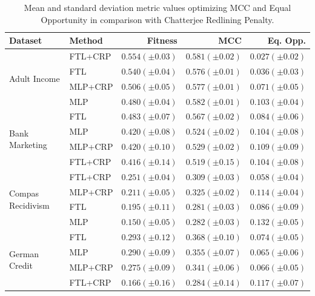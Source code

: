  \begin{table}
    \centering
    \caption{Mean and standard deviation metric values optimizing MCC and Equal Opportunity in comparison with Chatterjee Redlining Penalty.}\label{tab:complete_mcc_opportunity_crp}
    {\footnotesize\begin{tabular}{llrrr}
    \toprule
    Dataset & Method & Fitness & MCC & Eq. Opp. \\
    \midrule

    \multirow[t]{4}{*}{Adult Income} & FTL+CRP & $0.554 (\pm0.03)$ & $0.581 (\pm0.02)$ & $0.027 (\pm0.02)$ \\
     & FTL & $0.540 (\pm0.04)$ & $0.576 (\pm0.01)$ & $0.036 (\pm0.03)$ \\
     & MLP+CRP & $0.506 (\pm0.05)$ & $0.577 (\pm0.01)$ & $0.071 (\pm0.05)$ \\
     & MLP & $0.480 (\pm0.04)$ & $0.582 (\pm0.01)$ & $0.103 (\pm0.04)$ \\
    \midrule
    \multirow[t]{4}{*}{Bank Marketing} & FTL & $0.483 (\pm0.07)$ & $0.567 (\pm0.02)$ & $0.084 (\pm0.06)$ \\
     & MLP & $0.420 (\pm0.08)$ & $0.524 (\pm0.02)$ & $0.104 (\pm0.08)$ \\
     & MLP+CRP & $0.420 (\pm0.10)$ & $0.529 (\pm0.02)$ & $0.109 (\pm0.09)$ \\
     & FTL+CRP & $0.416 (\pm0.14)$ & $0.519 (\pm0.15)$ & $0.104 (\pm0.08)$ \\
    \midrule
    \multirow[t]{4}{*}{Compas Recidivism} & FTL+CRP & $0.251 (\pm0.04)$ & $0.309 (\pm0.03)$ & $0.058 (\pm0.04)$ \\
     & MLP+CRP & $0.211 (\pm0.05)$ & $0.325 (\pm0.02)$ & $0.114 (\pm0.04)$ \\
     & FTL & $0.195 (\pm0.11)$ & $0.281 (\pm0.03)$ & $0.086 (\pm0.09)$ \\
     & MLP & $0.150 (\pm0.05)$ & $0.282 (\pm0.03)$ & $0.132 (\pm0.05)$ \\
    \midrule
    \multirow[t]{4}{*}{German Credit} & FTL & $0.293 (\pm0.12)$ & $0.368 (\pm0.10)$ & $0.074 (\pm0.05)$ \\
     & MLP & $0.290 (\pm0.09)$ & $0.355 (\pm0.07)$ & $0.065 (\pm0.06)$ \\
     & MLP+CRP & $0.275 (\pm0.09)$ & $0.341 (\pm0.06)$ & $0.066 (\pm0.05)$ \\
     & FTL+CRP & $0.166 (\pm0.16)$ & $0.284 (\pm0.14)$ & $0.117 (\pm0.07)$ \\
     \bottomrule
\end{tabular}}
\end{table}

